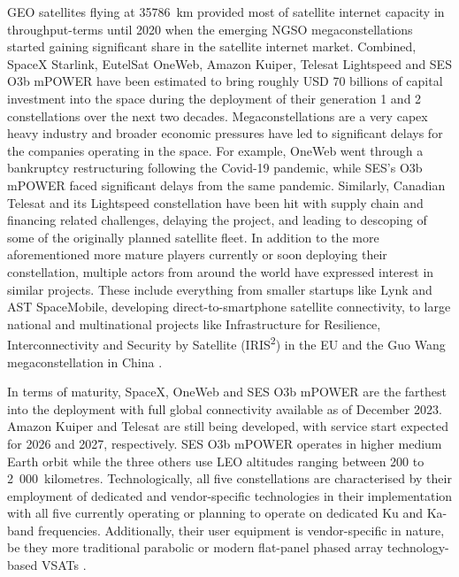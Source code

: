 \documentclass[english, 12pt, a4paper, elec, utf8, a-1b, online]{aaltothesis}
\begin{document}
GEO satellites flying at \qty{35786}{\kilo\meter} provided most of satellite internet capacity in throughput-terms until 2020 when the emerging NGSO megaconstellations started gaining significant share in the satellite internet market.
Combined, SpaceX Starlink, EutelSat OneWeb, Amazon Kuiper, Telesat Lightspeed and SES O3b mPOWER have been estimated to bring roughly USD 70 billions of capital investment into the space during the deployment of their generation 1 and 2 constellations over the next two decades.
Megaconstellations are a very capex heavy industry and broader economic pressures have led to significant delays for the companies operating in the space.
For example, OneWeb went through a bankruptcy restructuring following the Covid-19 pandemic, while SES's O3b mPOWER faced significant delays from the same pandemic.
Similarly, Canadian Telesat and its Lightspeed constellation have been hit with supply chain and financing related challenges, delaying the project, and leading to descoping of some of the originally planned satellite fleet.
In addition to the more aforementioned more mature players currently or soon deploying their constellation, multiple actors from around the world have expressed interest in similar projects.
These include everything from smaller startups like Lynk and AST SpaceMobile, developing direct-to-smartphone satellite connectivity, to large national and multinational projects like Infrastructure for Resilience, Interconnectivity and Security by Satellite (IRIS\textsuperscript{2}) in the EU and the Guo Wang megaconstellation in China \cite{euspa-secure-satcom-2023,euroconsult-ngso-tracker-2023-q3}.

In terms of maturity, SpaceX, OneWeb and SES O3b mPOWER are the farthest into the deployment with full global connectivity available as of December 2023.
Amazon Kuiper and Telesat are still being developed, with service start expected for 2026 and 2027, respectively.
SES O3b mPOWER operates in higher medium Earth orbit while the three others use LEO altitudes ranging between 200 to 2\ 000~kilometres.
Technologically, all five constellations are characterised by their employment of dedicated and vendor-specific technologies in their implementation with all five currently operating or planning to operate on dedicated Ku and Ka-band frequencies.
Additionally, their user equipment is vendor-specific in nature, be they more traditional parabolic or modern flat-panel phased array technology-based VSATs \cite{euspa-secure-satcom-2023,euroconsult-ngso-tracker-2023-q3}.
\end{document}
